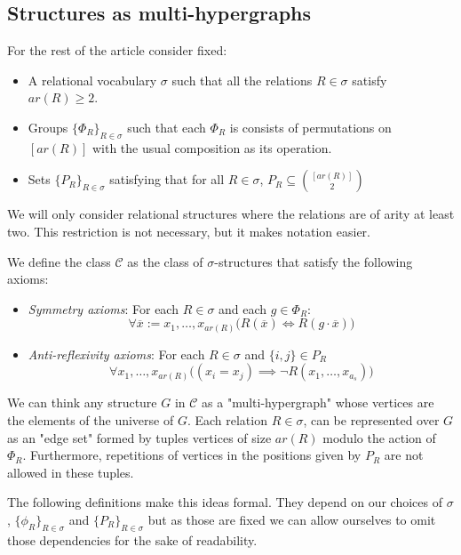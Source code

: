 \documentclass[12pt,notitlepage,a4paper]{article}
\theoremstyle{definition}
\begin{document}
\subsection{Structures as multi-hypergraphs}

For the rest of the article consider fixed:
\begin{itemize}
	\item A relational vocabulary $\sigma$ such that all the relations $R\in\sigma$ satisfy $ar(R)\geq 2$. 
	\item 
	Groups $\{ \Phi_R \}_{R\in \sigma}$
	such that each $\Phi_R$ is consists of 
	permutations on $[ar(R)]$ with the usual 
	composition as its operation.	
	\item 
	Sets $\{P_R\}_{R\in \sigma}$ satisfying that for 
	all $R\in \sigma$, 
	$P_R\subseteq \binom{[ar(R)]}{2}$
	
	
\end{itemize}

We will only consider relational structures where the relations
are of arity at least two. This restriction is not necessary, but 
it makes notation easier. 





We define the class $\mathcal{C}$ as the 
class of $\sigma$-structures that
satisfy the 
following axioms: 
\begin{itemize}
	\item \textit{Symmetry axioms}: For each $R\in \sigma$ and
	each $g\in \Phi_R$:
	\[ \forall \overline{x}:=x_1,\dots, x_{ar(R)} \big(  R(\overline{x})
	\iff R(g\cdot\overline{x}) \big)    \]
	\item \textit{Anti-reflexivity axioms}: For each 
	$R\in \sigma$ and $\{i,j\}\in P_R$
	\[ \forall x_1,\dots, x_{ar(R)} 
	\big( (x_i=x_j) \implies \neg R(x_1,\dots, x_{a_s})
	\big)\]
	\end{itemize}

We can think any structure $G$ in $\mathcal{C}$
as a "multi-hypergraph" whose vertices are the elements
of the universe of $G$. Each relation $R\in \sigma$, can be 
represented over $G$ as an "edge set" formed by tuples vertices
of size $ar(R)$ modulo the action of $\Phi_R$. Furthermore, 
repetitions of vertices in the positions given by
$P_R$ are not allowed in these tuples.\par
The following definitions make this ideas formal. They 
depend on our choices of $\sigma$, $\{\phi_R\}_{R\in \sigma}$
and $\{P_R\}_{R\in \sigma}$ but as those are fixed we can
allow ourselves to omit those dependencies for the sake of readability. 
\end{document}
